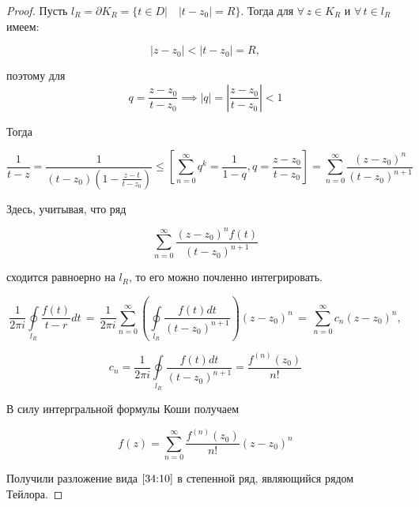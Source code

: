 \documentclass[../../main.tex]{subfiles}
\begin{document}
\begin{proof}
	Пусть $ l_R = \partial K_R = \{t \in D | \quad |t - z_0| = R \} $. Тогда для $ \forall\, z \in K_R $ и $ \forall\, t \in l_R $ имеем:
	
	\[ |z - z_0| < |t - z_0| = R, \]
	
	поэтому для \[ q = \frac{z - z_0}{t - z_0} \implies |q | = |\frac{z - z_0}{t - z_0}| < 1 \]
	
	Тогда
	
	\[ \frac{1}{t - z} = \frac{1}{(t - z_0)(1 - \frac{z - t}{t - z_0})} \leq \left[ \sum\limits_{n = 0}^{\infty}q^k = \frac{1}{1 - q}, q = \frac{z - z_0}{t - z_0} \right] = \sum\limits_{n = 0}^{\infty}\frac{(z - z_0)^n}{(t - z_0)^{n + 1}} \]
	
	Здесь, учитывая, что ряд
	
	\[ \sum\limits_{n = 0}^{\infty}\frac{(z - z_0)^n f(t)}{(t - z_0)^{n + 1}} \]
	
	сходится равноерно на $ l_R $, то его можно почленно интегрировать.
	
	\[ \frac{1}{2 \pi i} \underset{l_R}\oint \frac{f(t)}{t - r} dt\, =\, \frac{1}{2 \pi i} \sum\limits_{n = 0}^{\infty} \left( \underset{l_R}\oint\frac{f(t)dt}{(t - z_0)^{n + 1}} \right)(z - z_0)^n\, =\, \sum\limits_{n = 0}^{\infty} c_n (z - z_0)^n, \]
	
	\[ c_n = \frac{1}{2 \pi i} \underset{l_R}\oint\frac{f(t)dt}{(t - z_0)^{n + 1}} = \frac{f^{(n)}(z_0)}{n!} \]
	
	В силу интергральной формулы Коши получаем
	
	\[ f(z) = \sum\limits_{n = 0}^{\infty} \frac{f^{(n)}(z_0)}{n!} (z - z_0)^n \]
	
	Получили разложение вида $ \eqref{34:10} $ в степенной ряд, являющийся рядом Тейлора.
 \end{proof}
\end{document}
